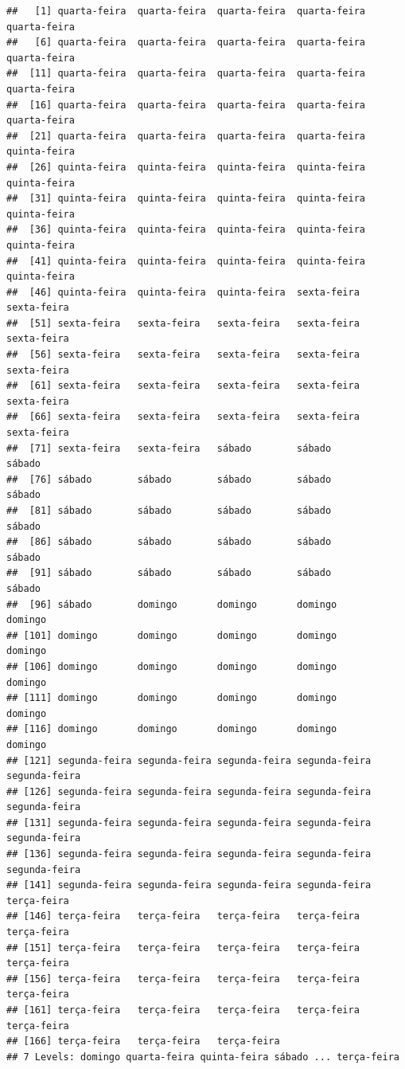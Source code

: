 \documentclass[]{book}
\theoremstyle{definition}
\theoremstyle{definition}
\theoremstyle{definition}
\theoremstyle{remark}
\begin{document}
\begin{verbatim}
##   [1] quarta-feira  quarta-feira  quarta-feira  quarta-feira  quarta-feira 
##   [6] quarta-feira  quarta-feira  quarta-feira  quarta-feira  quarta-feira 
##  [11] quarta-feira  quarta-feira  quarta-feira  quarta-feira  quarta-feira 
##  [16] quarta-feira  quarta-feira  quarta-feira  quarta-feira  quarta-feira 
##  [21] quarta-feira  quarta-feira  quarta-feira  quarta-feira  quinta-feira 
##  [26] quinta-feira  quinta-feira  quinta-feira  quinta-feira  quinta-feira 
##  [31] quinta-feira  quinta-feira  quinta-feira  quinta-feira  quinta-feira 
##  [36] quinta-feira  quinta-feira  quinta-feira  quinta-feira  quinta-feira 
##  [41] quinta-feira  quinta-feira  quinta-feira  quinta-feira  quinta-feira 
##  [46] quinta-feira  quinta-feira  quinta-feira  sexta-feira   sexta-feira  
##  [51] sexta-feira   sexta-feira   sexta-feira   sexta-feira   sexta-feira  
##  [56] sexta-feira   sexta-feira   sexta-feira   sexta-feira   sexta-feira  
##  [61] sexta-feira   sexta-feira   sexta-feira   sexta-feira   sexta-feira  
##  [66] sexta-feira   sexta-feira   sexta-feira   sexta-feira   sexta-feira  
##  [71] sexta-feira   sexta-feira   sábado        sábado        sábado       
##  [76] sábado        sábado        sábado        sábado        sábado       
##  [81] sábado        sábado        sábado        sábado        sábado       
##  [86] sábado        sábado        sábado        sábado        sábado       
##  [91] sábado        sábado        sábado        sábado        sábado       
##  [96] sábado        domingo       domingo       domingo       domingo      
## [101] domingo       domingo       domingo       domingo       domingo      
## [106] domingo       domingo       domingo       domingo       domingo      
## [111] domingo       domingo       domingo       domingo       domingo      
## [116] domingo       domingo       domingo       domingo       domingo      
## [121] segunda-feira segunda-feira segunda-feira segunda-feira segunda-feira
## [126] segunda-feira segunda-feira segunda-feira segunda-feira segunda-feira
## [131] segunda-feira segunda-feira segunda-feira segunda-feira segunda-feira
## [136] segunda-feira segunda-feira segunda-feira segunda-feira segunda-feira
## [141] segunda-feira segunda-feira segunda-feira segunda-feira terça-feira  
## [146] terça-feira   terça-feira   terça-feira   terça-feira   terça-feira  
## [151] terça-feira   terça-feira   terça-feira   terça-feira   terça-feira  
## [156] terça-feira   terça-feira   terça-feira   terça-feira   terça-feira  
## [161] terça-feira   terça-feira   terça-feira   terça-feira   terça-feira  
## [166] terça-feira   terça-feira   terça-feira  
## 7 Levels: domingo quarta-feira quinta-feira sábado ... terça-feira
\end{verbatim}
\end{document}
